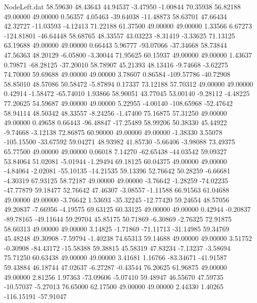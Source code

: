 \begin{filecontents}{NodeLeft.dat}
  58.59630   48.43643   44.94537    -3.47950   -1.00844   70.35938   56.82188   49.00000   49.00000    0.56357    4.05463  -39.64038  -11.48873
  58.63701   47.66434   42.32727   -11.03593   -4.12413   71.22188   61.37500   49.00000   49.00000    1.33566    6.67273 -124.81801  -46.64448
  58.68765   48.33557   43.03223    -8.31419   -3.33625   71.13125   63.19688   49.00000   49.00000    0.66443    5.96777  -93.07066  -37.34668
  58.73844   47.56363   48.20129    -6.05800   -3.30044   71.95625   60.15937   49.00000   49.00000    1.43637    0.79871  -68.28125  -37.20010
  58.78907   45.21393   48.13416    -9.74668   -3.62275   74.70000   59.69688   49.00000   49.00000    3.78607    0.86584 -109.57786  -40.72908
  58.85010   48.57086   50.58472    -5.87894    0.17337   73.12188   57.70312   49.00000   49.00000    0.42914   -1.58472  -65.74010    1.93866
  58.90051   43.77045   53.00140    -9.28112   -4.48225   77.20625   54.59687   49.00000   49.00000    5.22955   -4.00140 -108.65968  -52.47642
  58.94114   48.50342   48.33557    -8.24256   -1.47400   75.16875   57.31250   49.00000   49.00000    0.49658    0.66443  -96.48847  -17.25489
  58.99206   50.38330   45.44922    -9.74668   -3.12138   72.86875   60.90000   49.00000   49.00000   -1.38330    3.55078 -105.15500  -33.67592
  59.04271   48.93982   41.85730    -5.66406   -3.98088   73.49375   65.77500   49.00000   49.00000    0.06018    7.14270  -62.65438  -44.03542
  59.09327   53.84064   51.02081    -5.01944   -1.29494   69.18125   60.04375   49.00000   49.00000   -4.84064   -2.02081  -55.10135  -14.21535
  59.13396   52.76642   50.28259    -6.66681   -4.30319   67.93125   58.72187   49.00000   49.00000   -3.76642   -1.28259  -74.02235  -47.77879
  59.18477   52.76642   47.46307    -3.08557   -1.11588   66.91563   61.04688   49.00000   49.00000   -3.76642    1.53693  -35.32245  -12.77420
  59.24654   48.57056   49.20837    -7.66956   -4.19575   69.63125   60.33125   49.00000   49.00000    0.42944   -0.20837  -89.78165  -49.11644
  59.29704   45.85175   50.71869    -6.30869   -2.76325   72.91875   58.60313   49.00000   49.00000    3.14825   -1.71869  -71.11713  -31.14985
  59.34769   45.48248   49.30908    -7.59794   -1.40238   74.65313   59.14688   49.00000   49.00000    3.51752   -0.30908  -84.43172  -15.58388
  59.38815   45.58319   47.83234    -7.13237   -3.58694   75.71250   60.63438   49.00000   49.00000    3.41681    1.16766  -83.34671  -41.91587
  59.43884   46.18744   47.02637    -6.27287   -0.43544   76.20625   61.96875   49.00000   49.00000    2.81256    1.97363  -73.09606   -5.07410
  59.48947   46.55670   47.59735   -10.57037   -5.27013   76.65000   62.17500   49.00000   49.00000    2.44330    1.40265 -116.15191  -57.91047

\end{filecontents}
